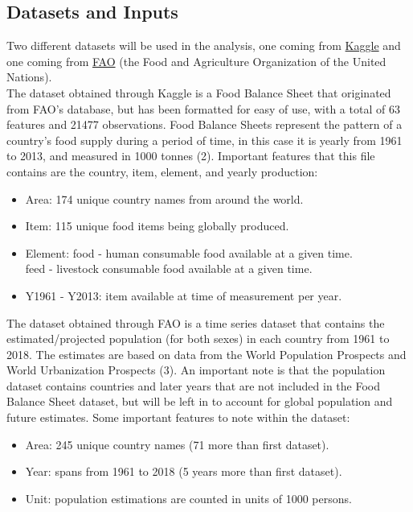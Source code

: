 \documentclass[12pt, a4paper]{article}
\begin{document}
\begin{spacing}{1.1}
	\section{Datasets and Inputs}
	Two different datasets will be used in the analysis, one coming from \href{https://www.kaggle.com/dorbicycle/world-foodfeed-production}{Kaggle} and one coming from \href{http://www.fao.org/faostat/en/#data/OA}{FAO} (the Food and Agriculture Organization of the United Nations).\vspace*{2mm}\\	
	The dataset obtained through Kaggle is a Food Balance Sheet that originated from FAO's database, but has been formatted for easy of use, with a total of 63 features and 21477 observations. Food Balance Sheets represent the pattern of a country's food supply during a period of time, in this case it is yearly from 1961 to 2013, and measured in 1000 tonnes (2). Important features that this file contains are the country, item, element, and yearly production:
	\begin{itemize}
		\item Area: 174 unique country names from around the world.
		\item Item: 115 unique food items being globally produced.
		\item Element: food - human consumable food available at a given time. \\ 
		\hspace*{16.5mm} feed - livestock consumable food available at a given time.
		\item Y1961 - Y2013: item available at time of measurement per year.
	\end{itemize} \vspace*{2mm}
	The dataset obtained through FAO is a time series dataset that contains the estimated/projected population (for both sexes) in each country from 1961 to 2018. The estimates are based on data from the World Population Prospects and World Urbanization Prospects (3). An important note is that the population dataset contains countries and later years that are not included in the Food Balance Sheet dataset, but will be left in to account for global population and future estimates. Some important features to note within the dataset:
	\begin{itemize}
		\item Area: 245 unique country names (71 more than first dataset).
		\item Year: spans from 1961 to 2018 (5 years more than first dataset).
		\item Unit: population estimations are counted in units of 1000 persons.

\end{itemize}
\end{spacing}
\end{document}
